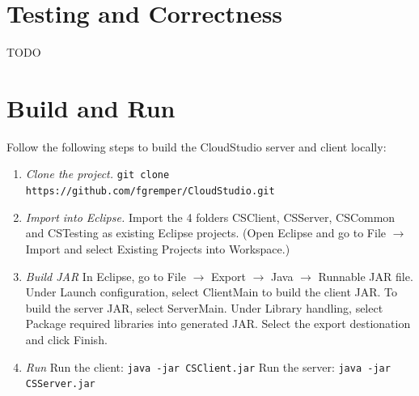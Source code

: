 \section{Testing and Correctness}

TODO


\section{Build and Run}

Follow the following steps to build the CloudStudio server and client locally:

\begin{enumerate}


\item \emph{Clone the project.} \newline
\texttt{git clone https://github.com/fgremper/CloudStudio.git}
\item \emph{Import into Eclipse.} \newline Import the 4 folders CSClient, CSServer, CSCommon and CSTesting as existing Eclipse projects. (Open Eclipse and go to File $\rightarrow$ Import and select Existing Projects into Workspace.)
\item \emph{Build JAR} \newline
In Eclipse, go to File $\rightarrow$ Export $\rightarrow$ Java $\rightarrow$ Runnable JAR file.
Under Launch configuration, select ClientMain to build the client JAR. To build the server JAR, select ServerMain. Under Library handling, select Package required libraries into generated JAR.
Select the export destionation and click Finish.
\item \emph{Run} \newline
Run the client:
\texttt{java -jar CSClient.jar} \newline
Run the server:
\texttt{java -jar CSServer.jar}

\end{enumerate}
